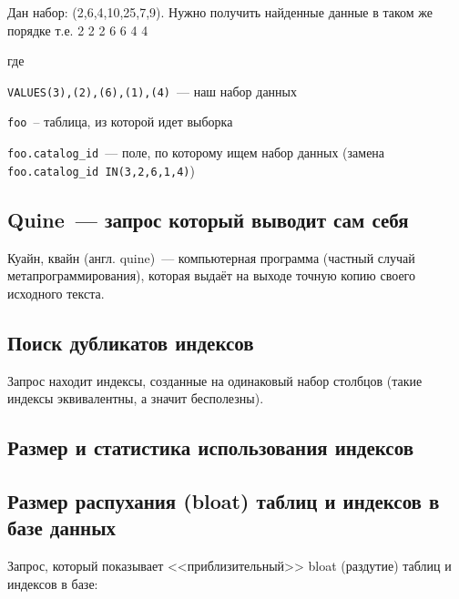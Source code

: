 Дан набор: (2,6,4,10,25,7,9). Нужно получить найденные данные в таком же порядке т.е. 2 2 2 6 6 4 4



где

\lstinline!VALUES(3),(2),(6),(1),(4)!~--- наш набор данных

\lstinline!foo!~-- таблица, из которой идет выборка

\lstinline!foo.catalog_id!~--- поле, по которому ищем набор данных (замена \lstinline!foo.catalog_id IN(3,2,6,1,4)!)



\subsection{Quine~--- запрос который выводит сам себя}

Куайн, квайн (англ. quine)~--- компьютерная программа (частный случай метапрограммирования), которая выдаёт на выходе точную копию своего исходного текста.





\subsection{Поиск дубликатов индексов}

Запрос находит индексы, созданные на одинаковый набор столбцов (такие индексы эквивалентны, а значит бесполезны).





\subsection{Размер и статистика использования индексов}





\subsection{Размер распухания (bloat) таблиц и индексов в базе данных}
\label{sec:snippets-bloating}

Запрос, который показывает <<приблизительный>> bloat (раздутие) таблиц и индексов в базе:


